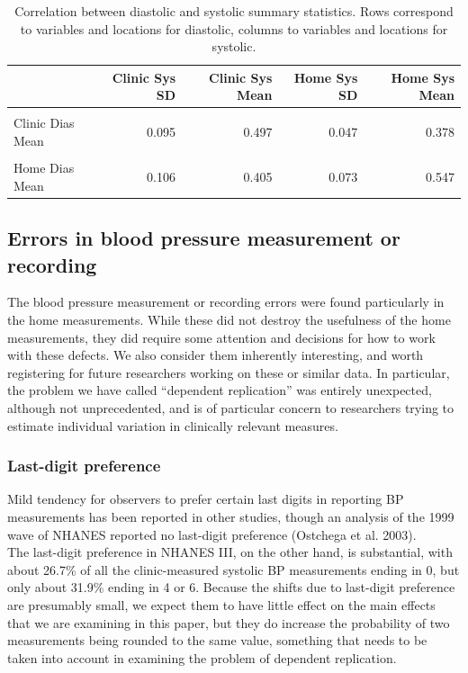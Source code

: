 \documentclass[
]{article}
\begin{document}
\begin{table}[!h]

\caption{\label{tab:SD-mean3}Correlation between diastolic and systolic summary statistics. Rows correspond to variables and locations for diastolic, columns to variables and locations for systolic.}
\centering
\begin{tabular}[t]{lrrrr}
\toprule
  & Clinic Sys SD & Clinic Sys Mean & Home Sys SD & Home Sys Mean\\
\midrule
\cellcolor{gray!6}{Clinic Dias SD} & \cellcolor{gray!6}{0.150} & \cellcolor{gray!6}{0.041} & \cellcolor{gray!6}{0.007} & \cellcolor{gray!6}{0.030}\\
Clinic Dias Mean & 0.095 & 0.497 & 0.047 & 0.378\\
\cellcolor{gray!6}{Home Dias SD} & \cellcolor{gray!6}{0.022} & \cellcolor{gray!6}{0.045} & \cellcolor{gray!6}{0.224} & \cellcolor{gray!6}{0.060}\\
Home Dias Mean & 0.106 & 0.405 & 0.073 & 0.547\\
\bottomrule
\end{tabular}
\end{table}

\hypertarget{sec:errors}{%
\subsection{Errors in blood pressure measurement or recording}\label{sec:errors}}

The blood pressure measurement or recording errors were found particularly in the home measurements.
While these did not destroy the usefulness of the home measurements, they did require some attention and decisions for how to work with these defects.
We also consider them inherently interesting, and worth registering for future researchers working on these or similar data.
In particular, the problem we have called ``dependent replication'' was entirely unexpected, although not unprecedented, and is of particular concern to researchers trying to estimate individual variation in clinically relevant measures.

\hypertarget{sec:lastdigit}{%
\subsubsection{Last-digit preference}\label{sec:lastdigit}}

Mild tendency for observers to prefer certain last digits in reporting BP measurements has been reported in other studies, though an analysis of the 1999 wave of NHANES reported no last-digit preference (Ostchega et al. 2003).\\
The last-digit preference in NHANES III, on the other hand, is substantial, with about 26.7\% of all the clinic-measured systolic BP measurements ending in 0, but only about 31.9\% ending in 4 or 6. Because the shifts due to last-digit preference are presumably small, we expect them to have little effect on the main effects that we are examining in this paper, but they do increase the probability of two measurements being rounded to the same value, something that needs to be taken into account in examining the problem of dependent replication.
\end{document}

